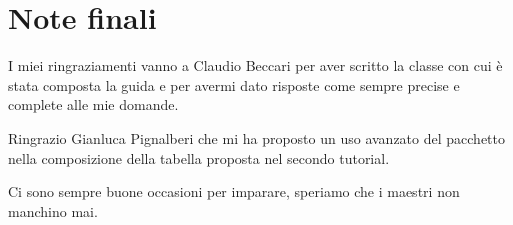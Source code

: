 

\chapter{Note finali}

I miei ringraziamenti vanno a Claudio Beccari per aver scritto la classe
 con cui è stata composta la guida e per avermi dato
risposte come sempre precise e complete alle mie domande.

Ringrazio Gianluca Pignalberi che mi ha proposto un uso avanzato del pacchetto
 nella composizione della tabella proposta nel secondo tutorial.

Ci sono sempre buone occasioni per imparare, speriamo che i maestri non manchino
mai.

